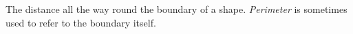 The distance all the way round the boundary of a shape.
  \textit{Perimeter} is sometimes used to refer to the
  boundary itself.